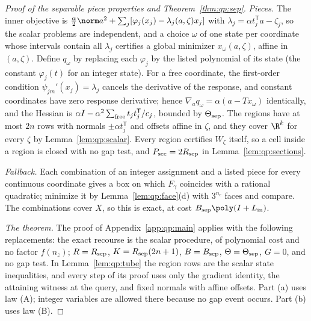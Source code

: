 \begin{proof}[Proof of the separable piece properties and Theorem~\ref{thm:qp:sep}]
\emph{Pieces.} The inner objective is
$\frac\alpha2\norm a^2+\sum_j[\varphi_j(x_j)-\lambda_j(a,\zeta)x_j]$ with
$\lambda_j=\alpha t_j^{\mathsf T} a-\zeta_j$, so the scalar problems are independent,
and a choice $\omega$ of one state per coordinate whose intervals contain all
$\lambda_j$ certifies a global minimizer $x_\omega(a,\zeta)$, affine in
$(a,\zeta)$. Define $q_\omega$ by replacing each $\varphi_j$ by the listed
polynomial of its state (the constant $\varphi_j(t)$ for an integer state).
For a free coordinate, the first-order condition $\psi_{jm}'(x_j)=\lambda_j$
cancels the derivative of the response, and constant coordinates have zero
response derivative; hence
$\nabla_aq_\omega=\alpha(a-Tx_\omega)$ identically, and the Hessian is
$\alpha I-\alpha^2\sum_{\rm free}t_jt_j^{\mathsf T}/c_j$, bounded by
$\Theta_{\rm sep}$. The regions have at most $2n$ rows with normals
$\pm\alpha t_j^{\mathsf T}$ and offsets affine in $\zeta$, and they cover $\R^k$ for
every $\zeta$ by Lemma~\ref{lem:qp:scalar}. Every region certifies
$W_\zeta$ itself, so a cell inside a region is closed with no gap test, and
$P_{\rm sec}=2R_{\rm sep}$ in Lemma~\ref{lem:qp:sections}.

\emph{Fallback.} Each combination of an integer assignment and a listed piece
for every continuous coordinate gives a box on which $F_\gamma$ coincides with
a rational quadratic; minimize it by Lemma~\ref{lem:qp:face}(d) with $3^{n_c}$
faces and compare. The combinations cover $X$, so this is exact, at cost
$B_{\rm sep}\poly(I+L_{\rm in})$.

\emph{The theorem.} The proof of Appendix~\ref{app:qp:main} applies with the
following replacements: the exact recourse is the scalar procedure, of
polynomial cost and no factor $f(n_z)$; $R=R_{\rm sep}$, $K=R_{\rm sep}(2n+1)$,
$B=B_{\rm sep}$, $\Theta=\Theta_{\rm sep}$, $G=0$, and no gap test. In
Lemma~\ref{lem:qp:tube} the region rows are the scalar state inequalities, and
every step of its proof uses only the gradient identity, the attaining witness
at the query, and fixed normals with affine offsets. Part (a) uses law (A); integer
variables are allowed there because no gap event occurs. Part (b) uses law
(B).
\end{proof}

